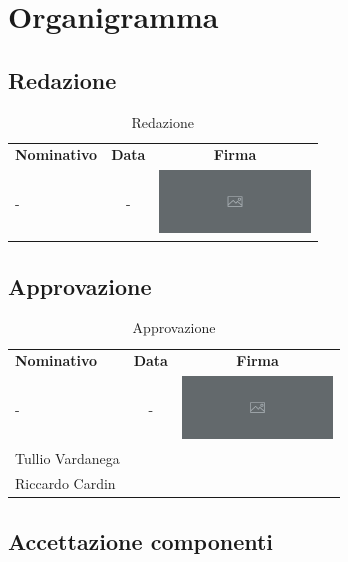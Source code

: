 \documentclass[../piano-di-progetto.tex]{subfiles}
\begin{document}
  \section{Organigramma}

  \subsection{Redazione}

  \begin{table}[H]
    \centering
    \begin{tabular}{lcc}
      \rowcolor{lightgray}

      \textbf{Nominativo}  & \textbf{Data} & \textbf{Firma}  \\
            - & - & \includegraphics[width=4cm]{img/ph.png}
    \end{tabular}
    \caption{Redazione}
  \end{table}

  \subsection{Approvazione}

  \begin{table}[H]
    \centering
    \begin{tabular}{lcc}
      \rowcolor{lightgray}
      \textbf{Nominativo}  & \textbf{Data} & \textbf{Firma}  \\
      - & - & \includegraphics[width=4cm]{img/ph.png} \\
      Tullio Vardanega & &    \\
      Riccardo Cardin & &
    \end{tabular}
    \caption{Approvazione}
  \end{table}

  \subsection{Accettazione componenti}
\end{document}
